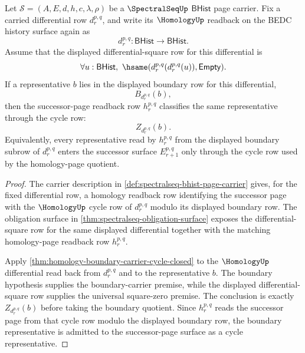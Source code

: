 \begin{theorem}
\label{thm:spectralseq-boundary-row-successor-cycle-readback}
Let $\mathcal S=(A,E,d,h,c,\lambda,\rho)$ be a $\SpectralSeqUp$ $\mathsf{BHist}$ page carrier. Fix a carried differential row $d_r^{p,q}$, and write its $\HomologyUp$ readback on the BEDC history surface again as
$$
d_r^{p,q}:\mathsf{BHist}\to\mathsf{BHist}.
$$
Assume that the displayed differential-square row for this differential is
$$
\forall u:\mathsf{BHist},\ \hsame(d_r^{p,q}(d_r^{p,q}(u)),\mathsf{Empty}).
$$
If a representative $b$ lies in the displayed boundary row for this differential,
$$
B_{d_r^{p,q}}(b),
$$
then the successor-page readback row $h_r^{p,q}$ classifies the same representative through the cycle row:
$$
Z_{d_r^{p,q}}(b).
$$
Equivalently, every representative read by $h_r^{p,q}$ from the displayed boundary subrow of $d_r^{p,q}$ enters the successor surface $E_{r+1}^{p,q}$ only through the cycle row used by the homology-page quotient.
\end{theorem}
\begin{proof}
The carrier description in \autoref{def:spectralseq-bhist-page-carrier} gives, for the fixed differential row, a homology readback row identifying the successor page with the $\HomologyUp$ cycle row of $d_r^{p,q}$ modulo its displayed boundary row. The obligation surface in \autoref{thm:spectralseq-obligation-surface} exposes the differential-square row for the same displayed differential together with the matching homology-page readback row $h_r^{p,q}$.

Apply \autoref{thm:homology-boundary-carrier-cycle-closed} to the $\HomologyUp$ differential read back from $d_r^{p,q}$ and to the representative $b$. The boundary hypothesis supplies the boundary-carrier premise, while the displayed differential-square row supplies the universal square-zero premise. The conclusion is exactly $Z_{d_r^{p,q}}(b)$ before taking the boundary quotient. Since $h_r^{p,q}$ reads the successor page from that cycle row modulo the displayed boundary row, the boundary representative is admitted to the successor-page surface as a cycle representative.
\end{proof}

